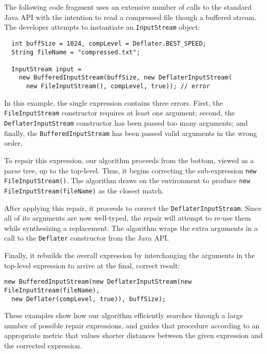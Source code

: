 The following code fragment uses an extensive number of calls to the standard Java API with the intention to read a compressed file though a buffered stream. The developer attempts to instantiate an \lstinline{InputStream} object:
\begin{lstlisting}
  int buffSize = 1024, compLevel = Deflater.BEST_SPEED;
  String fileName = "compressed.txt";
  
  InputStream input = 
    new BufferedInputStream(buffSize, new DeflaterInputStream(
      new FileInputStream(), compLevel, true)); // error 
\end{lstlisting}
In this example, the single expression contains three errors. First, the \lstinline{FileInputStream} constructor requires at least one argument; second, the \lstinline{DeflaterInputStream} constructor has been passed too many arguments; and finally, the \lstinline{BufferedInputStream} has been passed valid arguments in the wrong order.

To repair this expression, our algorithm proceeds from the bottom, viewed as a parse tree, up to the top-level. Thus, it begins correcting the sub-expression \lstinline{new FileInputStream()}. The algorithm draws on the environment to produce \lstinline{new FileInputStream(fileName)} as the closest match.

After applying this repair, it proceeds to correct the \lstinline{DeflaterInputStream}. Since all of its arguments are now well-typed, the repair will attempt to re-use them while synthesizing a replacement. The algorithm wraps the extra arguments in a call to the \lstinline{Deflater} constructor from the Java API.

Finally, it rebuilds the overall expression by interchanging the arguments in the top-level expression to arrive at the final, correct result:
\begin{lstlisting}   
new BufferedInputStream(new DeflaterInputStream(new FileInputStream(fileName),
  new Deflater(compLevel, true)), buffSize);
\end{lstlisting}

These examples show how our algorithm efficiently searches through a large number of possible repair expressions, and guides that procedure according to an appropriate metric that values shorter distances between the given expression and the corrected expression.
